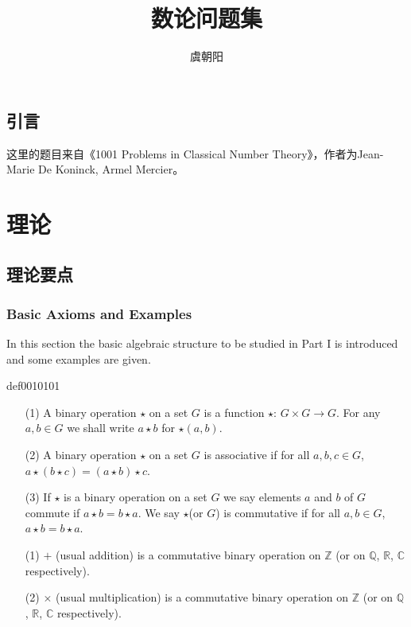 \documentclass[cn,11pt,chinese]{elegantbook}
\title{数论问题集}
\author{虞朝阳}
\def\real{\mathbb{R}}
\numberwithin{equation}{section}
\begin{document}
\maketitle

\tableofcontents
\mainmatter
\hypersetup{pageanchor=true}

\chapter*{引言}
这里的题目来自《1001 Problems in Classical Number Theory》，作者为Jean-Marie De Koninck, Armel Mercier。

\part{理论}
\chapter{理论要点}\label{chapter001}
\section{Basic Axioms and Examples}\label{section00101}
In this section the basic algebraic structure to be studied in Part I is introduced and some examples are given.

\begin{definition}{}{def0010101}
\begin{enumerate}
\item[(1)] A binary operation $\star$ on a set $G$ is a function $\star$: $G \times G \to G$. For any $a, b \in G$ we shall write $a \star b$ for $\star(a, b)$. 

\item[(2)] A binary operation $\star$ on a set $G$ is associative if for all $a,b, c \in G$, $a \star (b \star c) = (a \star b) \star c$.

\item[(3)] If $\star$ is a binary operation on a set $G$ we say elements $a$ and $b$ of $G$ commute if $a \star b = b \star a$. We say $\star$(or $G$) is commutative if for all $a,b \in G$, $a \star b = b \star a$.
\end{enumerate}
\end{definition}

\begin{example}
\begin{enumerate}
\item[(1)]$+$ (usual addition) is a commutative binary operation on $\mathbb{Z}$ (or on $\mathbb{Q}$, $\real$, $\mathbb{C}$ respectively).

\item[(2)]$\times$ (usual multiplication) is a commutative binary operation on $\mathbb{Z}$ (or on $\mathbb{Q}$, $\real$, $\mathbb{C}$ respectively).
\end{enumerate}
\end{example}
\end{document}
